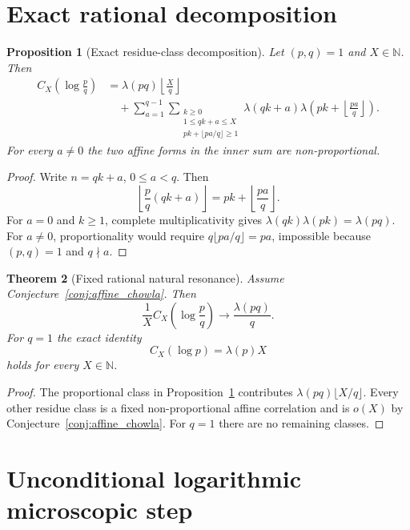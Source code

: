 \documentclass[preprint,12pt]{elsarticle}
\numberwithin{equation}{section}
\theoremstyle{plain}
\newtheorem{theorem}{Theorem}[section]
\newtheorem{proposition}[theorem]{Proposition}
\theoremstyle{definition}
\theoremstyle{remark}
\begin{document}
\section{Exact rational decomposition}
\label{sec:rational}

\begin{proposition}[Exact residue-class decomposition]
\label{prop:decomposition}
Let $(p,q)=1$ and $X\in\mathbb N$. Then
\begin{align}
C_X\!\left(\log\frac pq\right)
&=
\lambda(pq)\left\lfloor\frac Xq\right\rfloor \nonumber\\
&\quad+
\sum_{a=1}^{q-1}
\sum_{\substack{k\ge0\\1\le qk+a\le X\\
pk+\lfloor pa/q\rfloor\ge1}}
\lambda(qk+a)
\lambda\!\left(pk+\left\lfloor\frac{pa}{q}\right\rfloor\right).
\label{eq:decomp}
\end{align}
For every $a\ne0$ the two affine forms in the inner sum are
non-proportional.
\end{proposition}

\begin{proof}
Write $n=qk+a$, $0\le a<q$. Then
\[
\left\lfloor\frac pq(qk+a)\right\rfloor
=
pk+\left\lfloor\frac{pa}{q}\right\rfloor.
\]
For $a=0$ and $k\ge1$, complete multiplicativity gives
$\lambda(qk)\lambda(pk)=\lambda(pq)$. For $a\ne0$, proportionality would
require $q\lfloor pa/q\rfloor=pa$, impossible because $(p,q)=1$ and
$q\nmid a$.
\end{proof}

\begin{theorem}[Fixed rational natural resonance]
\label{thm:fixed}
Assume Conjecture~\ref{conj:affine_chowla}. Then
\[
\frac1X C_X\!\left(\log\frac pq\right)\longrightarrow\frac{\lambda(pq)}q.
\]
For $q=1$ the exact identity
\[
C_X(\log p)=\lambda(p)X
\]
holds for every $X\in\mathbb N$.
\end{theorem}

\begin{proof}
The proportional class in Proposition~\ref{prop:decomposition} contributes
$\lambda(pq)\lfloor X/q\rfloor$. Every other residue class is a fixed
non-proportional affine correlation and is $o(X)$ by
Conjecture~\ref{conj:affine_chowla}. For $q=1$ there are no remaining
classes.
\end{proof}

\section{Unconditional logarithmic microscopic step}
\label{sec:logstep}
\end{document}
